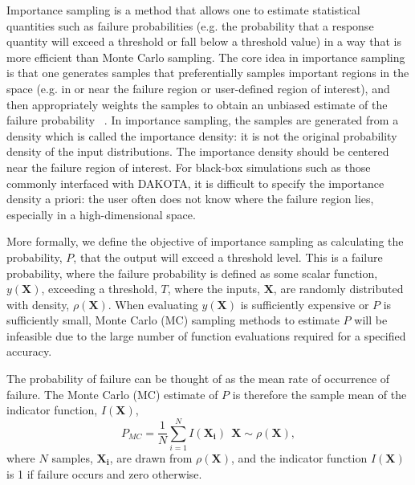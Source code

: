 Importance sampling is a method that allows one to estimate statistical
quantities such as failure probabilities (e.g. the probability that
a response quantity will exceed a threshold or fall below a threshold value)
in a way that is more efficient than Monte Carlo sampling.  The core idea
in importance sampling is that one generates samples that preferentially
samples important regions in the space (e.g. in or near the failure region
or user-defined region of interest), and then appropriately weights
the samples to obtain an unbiased estimate of the failure probability
~\cite{Srinivasan2002}.
In importance sampling, the samples are generated from a density which is
called the importance density:  it is not the original probability density
of the input distributions.  The importance density should be centered near the
failure region of interest.  For black-box simulations such as those commonly
interfaced with DAKOTA, it is difficult to specify the importance density a priori:
the user often does not know where the failure region lies, especially in a high-dimensional
space.~\cite{Swiler2010}

More formally, we define the objective of importance sampling as calculating the probability, $P$, that the output will exceed a threshold level.  This is a failure 
probability, where the failure probability is defined as some scalar function, 
$y\left(\textbf{X}\right)$, exceeding a threshold, $T$, 
where the inputs, $\textbf{X}$, are randomly distributed with density, $\rho\left(\textbf{X}\right)$.  
When evaluating $y\left(\textbf{X}\right)$ is sufficiently expensive or $P$ is sufficiently small, Monte Carlo (MC) sampling methods to estimate $P$ will be infeasible due to the large number of function evaluations required
for a specified accuracy. 

The probability of failure can be thought of as the mean rate of occurrence
of failure.  The Monte Carlo (MC) estimate of $P$ is therefore the sample
mean of the indicator function, $I\left(\textbf{X}\right)$,
\begin{equation}
P_{MC}=\frac{1}{N}\sum_{i=1}^{N}I\left(\mathbf{X_i}\right)\ \ \textbf{X}\sim \rho\left(\textbf{X}\right),
\label{mc_ind}
\end{equation}
where $N$ samples, $\mathbf{X_i}$, are drawn from
$\rho\left(\textbf{X}\right)$,
and the indicator function $I\left(\textbf{X}\right)$
is 1 if failure occurs and zero otherwise.

